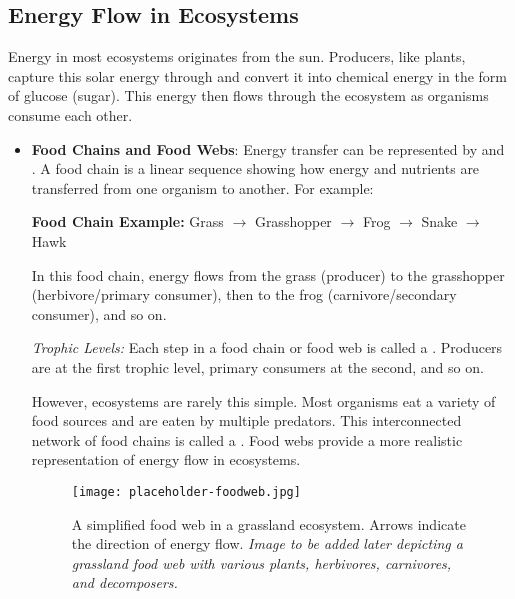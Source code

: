 \subsection{Energy Flow in Ecosystems}

Energy in most ecosystems originates from the sun.  Producers, like plants, capture this solar energy through  and convert it into chemical energy in the form of glucose (sugar). This energy then flows through the ecosystem as organisms consume each other.

\begin{itemize}
    \item \textbf{Food Chains and Food Webs}:  Energy transfer can be represented by  and . A food chain is a linear sequence showing how energy and nutrients are transferred from one organism to another. For example:

    \begin{example}
        \textbf{Food Chain Example:} Grass $\rightarrow$ Grasshopper $\rightarrow$ Frog $\rightarrow$ Snake $\rightarrow$ Hawk
    \end{example}

    In this food chain, energy flows from the grass (producer) to the grasshopper (herbivore/primary consumer), then to the frog (carnivore/secondary consumer), and so on.

    \begin{marginnote}
    \textit{Trophic Levels:} Each step in a food chain or food web is called a . Producers are at the first trophic level, primary consumers at the second, and so on.
    \end{marginnote}

    However, ecosystems are rarely this simple.  Most organisms eat a variety of food sources and are eaten by multiple predators. This interconnected network of food chains is called a . Food webs provide a more realistic representation of energy flow in ecosystems.

    \begin{figure}[h]
        \texttt{[image: placeholder-foodweb.jpg]}
        \caption{A simplified food web in a grassland ecosystem. Arrows indicate the direction of energy flow. \textit{Image to be added later depicting a grassland food web with various plants, herbivores, carnivores, and decomposers.}}
    \end{figure}


\end{itemize}
